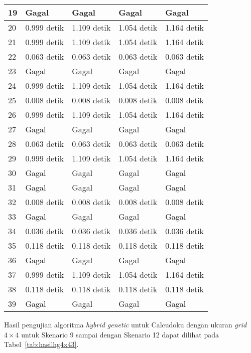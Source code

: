 \begin{table}
\begin{tabular}{| l | l | l | l | l |}
19 & Gagal & Gagal & Gagal & Gagal \\
\hline
20 & 0.999 detik & 1.109 detik & 1.054 detik & 1.164 detik \\
\hline
21 & 0.999 detik & 1.109 detik & 1.054 detik & 1.164 detik \\
\hline
22 & 0.063 detik & 0.063 detik & 0.063 detik & 0.063 detik \\
\hline
23 & Gagal & Gagal & Gagal & Gagal \\
\hline
24 & 0.999 detik & 1.109 detik & 1.054 detik & 1.164 detik \\
\hline
25 & 0.008 detik & 0.008 detik & 0.008 detik & 0.008 detik \\
\hline
26 & 0.999 detik & 1.109 detik & 1.054 detik & 1.164 detik \\
\hline
27 & Gagal & Gagal & Gagal & Gagal \\
\hline
28 & 0.063 detik & 0.063 detik & 0.063 detik & 0.063 detik \\
\hline
29 & 0.999 detik & 1.109 detik & 1.054 detik & 1.164 detik \\
\hline
30 & Gagal & Gagal & Gagal & Gagal \\
\hline
31 & Gagal & Gagal & Gagal & Gagal \\
\hline
32 & 0.008 detik & 0.008 detik & 0.008 detik & 0.008 detik \\
\hline
33 & Gagal & Gagal & Gagal & Gagal \\
\hline
34 & 0.036 detik & 0.036 detik & 0.036 detik & 0.036 detik \\
\hline
35 & 0.118 detik & 0.118 detik & 0.118 detik & 0.118 detik \\
\hline
36 & Gagal & Gagal & Gagal & Gagal \\
\hline
37 & 0.999 detik & 1.109 detik & 1.054 detik & 1.164 detik \\
\hline
38 & 0.118 detik & 0.118 detik & 0.118 detik & 0.118 detik \\
\hline
39 & Gagal & Gagal & Gagal & Gagal \\
\hline
\end{tabular}
\label{tab:hasilhg4x42}
\end{table}

Hasil pengujian algoritma \textit{hybrid genetic} untuk Calcudoku dengan ukuran \textit{grid} \begin{math}4 \times 4\end{math} untuk Skenario 9 sampai dengan Skenario 12 dapat dilihat pada Tabel~\ref{tab:hasilhg4x43}.


